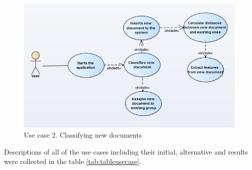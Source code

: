 \begin{figure}[H]
	\begin{center}
		\includegraphics[width=1.0\linewidth]{images/diagrams/use-case/use-case-11.PNG}
		\caption{Use case 2. Classifying new documents}
		\label{design-use-case-2}
	\end{center}
\end{figure}
 
Descriptions of all of the use cases including their initial, alternative and results were collected in the table \ref{tab:tableusecase}.
\vspace{5em}

